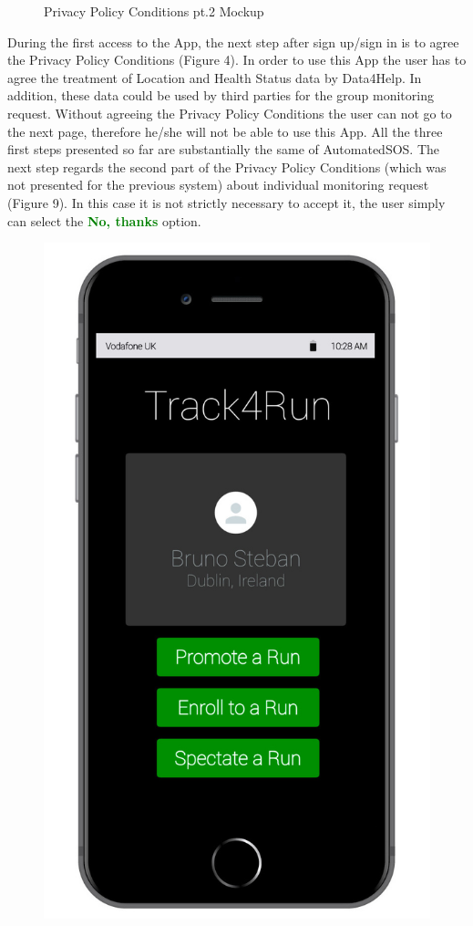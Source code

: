 \begin{enumerate}
\begin{figure}[H]
\begin{center}
\begin{minipage}[c]{.40\textwidth}
	\caption{Privacy Policy Conditions pt.2 Mockup}
        \end{minipage}
      \end{center}
\end{figure}
During the first access to the App, the next step after sign up/sign in is to agree the Privacy Policy Conditions (Figure 4). In order to use this App the user has to agree the treatment of Location and Health Status data by Data4Help. In addition, these data could be used by third parties for the group monitoring request. Without agreeing the Privacy Policy Conditions the user can not go to the next page, therefore he/she will not be able to use this App. All the three first steps presented so far are substantially the same of AutomatedSOS. The next step regards the second part of the Privacy Policy Conditions (which was not presented for the previous system) about individual monitoring request (Figure 9).  In this case it is not strictly necessary to accept it, the user simply can select the {\textcolor{Green}{\textbf{No, thanks}}} option.
\clearpage
\begin{figure}[H]
\begin{center}
        \begin{minipage}[c]{.40\textwidth}
        \centering
          \includegraphics[height=14 cm]{Images/Mockups/Track4RunMockup5.jpg}

\end{minipage}
\end{center}
\end{figure}
\end{enumerate}
